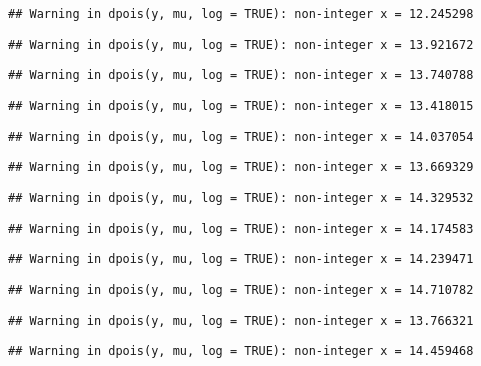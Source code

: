\documentclass[
]{article}
\begin{document}
\begin{verbatim}
## Warning in dpois(y, mu, log = TRUE): non-integer x = 12.245298
\end{verbatim}

\begin{verbatim}
## Warning in dpois(y, mu, log = TRUE): non-integer x = 13.921672
\end{verbatim}

\begin{verbatim}
## Warning in dpois(y, mu, log = TRUE): non-integer x = 13.740788
\end{verbatim}

\begin{verbatim}
## Warning in dpois(y, mu, log = TRUE): non-integer x = 13.418015
\end{verbatim}

\begin{verbatim}
## Warning in dpois(y, mu, log = TRUE): non-integer x = 14.037054
\end{verbatim}

\begin{verbatim}
## Warning in dpois(y, mu, log = TRUE): non-integer x = 13.669329
\end{verbatim}

\begin{verbatim}
## Warning in dpois(y, mu, log = TRUE): non-integer x = 14.329532
\end{verbatim}

\begin{verbatim}
## Warning in dpois(y, mu, log = TRUE): non-integer x = 14.174583
\end{verbatim}

\begin{verbatim}
## Warning in dpois(y, mu, log = TRUE): non-integer x = 14.239471
\end{verbatim}

\begin{verbatim}
## Warning in dpois(y, mu, log = TRUE): non-integer x = 14.710782
\end{verbatim}

\begin{verbatim}
## Warning in dpois(y, mu, log = TRUE): non-integer x = 13.766321
\end{verbatim}

\begin{verbatim}
## Warning in dpois(y, mu, log = TRUE): non-integer x = 14.459468
\end{verbatim}
\end{document}
